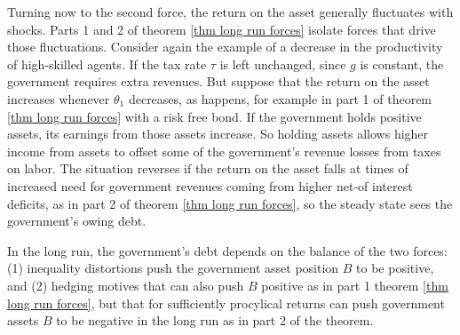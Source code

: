 \documentclass[thmsb,11pt]{article}
\begin{document}
%




 Turning now to the second force, the return on the asset  generally fluctuates
 with  shocks.  Parts 1 and 2 of  theorem \ref{thm long run forces} isolate forces that  drive those  fluctuations.
 Consider again the example of a
 decrease in the productivity of high-skilled agents. If the  tax rate  $\tau $ is left unchanged,
 since $g$ is constant, the
 government requires  extra revenues. But  suppose that
 the return on the asset increases whenever $\theta_1 $ decreases, as happens, for
 example in part 1 of theorem \ref{thm long run forces} with a risk free bond. If the government holds positive assets, its earnings from those assets increase.
 So holding assets allows higher income from assets  to offset some of the government's revenue losses from taxes on labor.
 The situation reverses if the return on the asset falls at
 times of increased need for government revenues coming from higher net-of interest deficits, as in
  part 2 of  theorem \ref{thm long run forces}, so the steady state sees the government's owing debt.

In the  long run, the government's  debt depends on the balance of the two forces: (1) inequality
distortions  push the government asset position $B$ to be positive,  and (2)  hedging motives that can also push $B$ positive  as in part 1  theorem \ref{thm long run forces},
 but that for sufficiently procylical returns can
push   government assets $B$ to be negative in the long run as in part 2 of the theorem.
\color{black}
\end{document}
